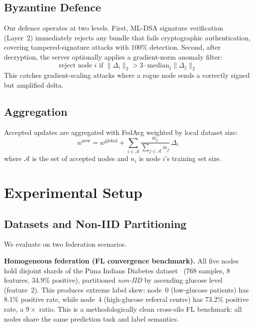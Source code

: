 \documentclass[runningheads]{llncs}
\begin{document}
\subsection{Byzantine Defence}

Our defence operates at two levels.
First, ML-DSA signature verification (Layer~2) immediately rejects
any bundle that fails cryptographic authentication, covering
tampered-signature attacks with 100\% detection.
Second, after decryption, the server optionally applies a
gradient-norm anomaly filter:
\begin{equation}
  \text{reject node } i \text{ if } \|\Delta_i\|_2 > 3 \cdot \text{median}_j\|\Delta_j\|_2
\end{equation}
This catches gradient-scaling attacks where a rogue node sends a
correctly signed but amplified delta.

\subsection{Aggregation}

Accepted updates are aggregated with FedAvg weighted by local
dataset size:
\begin{equation}
  w^{\text{new}} = w^{\text{global}} +
    \sum_{i \in \mathcal{A}} \frac{n_i}{\sum_{j\in\mathcal{A}} n_j}\,\Delta_i
\end{equation}
where $\mathcal{A}$ is the set of accepted nodes and $n_i$ is node
$i$'s training set size.

\section{Experimental Setup}
\label{sec:setup}

\subsection{Datasets and Non-IID Partitioning}

We evaluate on two federation scenarios.

\textbf{Homogeneous federation (FL convergence benchmark).}
All five nodes hold disjoint shards of the Pima Indians Diabetes
dataset~\cite{smith1988} (768 samples, 8 features, 34.9\% positive),
partitioned \emph{non-IID} by ascending glucose level (feature~2).
This produces extreme label skew: node~0 (low-glucose patients)
has 8.1\% positive rate, while node~4 (high-glucose referral
centre) has 73.2\% positive rate, a $9\times$ ratio.
This is a methodologically clean cross-silo FL benchmark: all nodes
share the same prediction task and label semantics.
\end{document}
